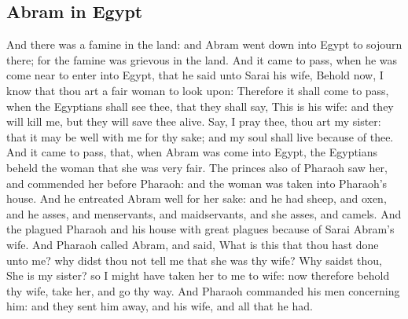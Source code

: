 \begin{biblechapter}
\section*{Abram in Egypt}
\verse And there was a famine in the land: and Abram went down into Egypt to sojourn there; for the famine was grievous in the land.
\verse And it came to pass, when he was come near to enter into Egypt, that he said unto Sarai his wife, Behold now, I know that thou art a fair woman to look upon:
\verse Therefore it shall come to pass, when the Egyptians shall see thee, that they shall say, This is his wife: and they will kill me, but they will save thee alive.
\verse Say, I pray thee, thou art my sister: that it may be well with me for thy sake; and my soul shall live because of thee.
\verse And it came to pass, that, when Abram was come into Egypt, the Egyptians beheld the woman that she was very fair.
\verse The princes also of Pharaoh saw her, and commended her before Pharaoh: and the woman was taken into Pharaoh's house.
\verse And he entreated Abram well for her sake: and he had sheep, and oxen, and he asses, and menservants, and maidservants, and she asses, and camels.
\verse And the \LORD plagued Pharaoh and his house with great plagues because of Sarai Abram's wife.
\verse And Pharaoh called Abram, and said, What is this that thou hast done unto me? why didst thou not tell me that she was thy wife?
\verse Why saidst thou, She is my sister? so I might have taken her to me to wife: now therefore behold thy wife, take her, and go thy way.
\verse And Pharaoh commanded his men concerning him: and they sent him away, and his wife, and all that he had.
\end{biblechapter}


